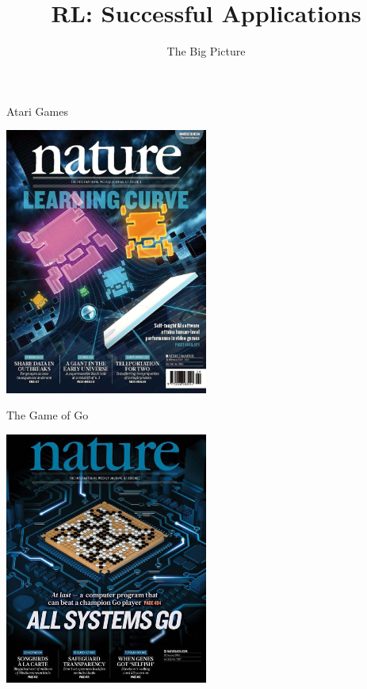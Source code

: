 


\title[ML-RL: Big Picture]{RL: Successful Applications}
\subtitle{The Big Picture}




	
	\maketitle

\begin{frame}[c]{Atari Games }

\centering
\includegraphics[width=0.5\textwidth]{images/nature_atari_rl.jpg}


\end{frame}
\begin{frame}[c]{The Game of Go }
	
	\centering
	\includegraphics[width=0.5\textwidth]{images/nature_go_rl.jpeg}
	
	
\end{frame}
